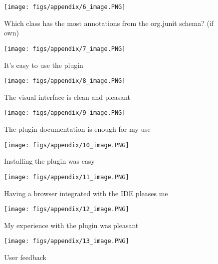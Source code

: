 \begin{apendicesenv}
\begin{figure}[ht]
  \texttt{[image: figs/appendix/6\_image.PNG]}
  \caption{Which class has the most annotations from the org.junit schema? (if own)}
  \label{fig:class_junit}
\end{figure}

\begin{figure}[ht]
  \texttt{[image: figs/appendix/7\_image.PNG]}
  \caption{It's easy to use the plugin}
  \label{fig:easy_to_use}
\end{figure}

\begin{figure}[ht]
  \texttt{[image: figs/appendix/8\_image.PNG]}
  \caption{The visual interface is clean and pleasant}
  \label{fig:clean_interface}
\end{figure}

\begin{figure}[ht]
  \texttt{[image: figs/appendix/9\_image.PNG]}
  \caption{The plugin documentation is enough for my use}
  \label{fig:documentation}
\end{figure}

\begin{figure}[ht]
  \texttt{[image: figs/appendix/10\_image.PNG]}
  \caption{Installing the plugin was easy}
  \label{fig:install_easy}
\end{figure}

\begin{figure}[ht]
  \texttt{[image: figs/appendix/11\_image.PNG]}
  \caption{Having a browser integrated with the IDE pleases me}
  \label{fig:browser_int}
\end{figure}

\begin{figure}[ht]
  \texttt{[image: figs/appendix/12\_image.PNG]}
  \caption{My experience with the plugin was pleasant}
  \label{fig:experience}
\end{figure}

\begin{figure}[ht]
  \texttt{[image: figs/appendix/13\_image.PNG]}
  \caption{User feedback}
  \label{fig:user_feedback}
\end{figure}


\end{apendicesenv}

